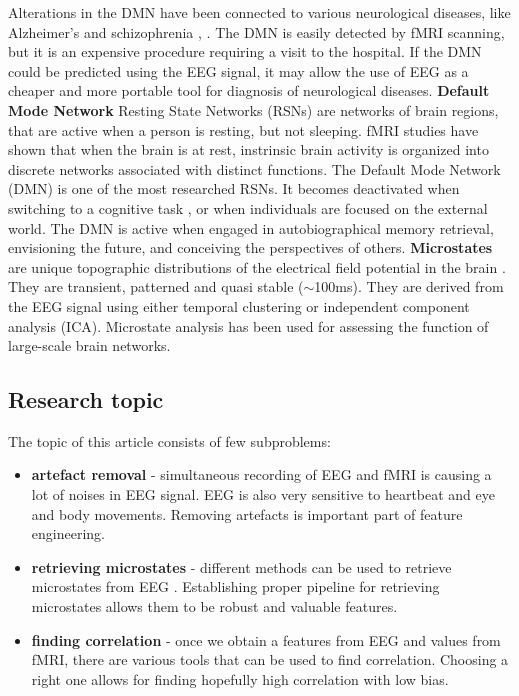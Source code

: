 \documentclass{article}
\begin{document}
Alterations in the DMN have been connected to various neurological diseases, like Alzheimer’s and schizophrenia \cite{Yuan20122062}, \cite{Khanna2015105}. The DMN is easily detected by fMRI scanning, but it is an expensive procedure requiring a visit to the hospital. If the DMN could be predicted using the EEG signal, it may allow the use of EEG as a cheaper and more portable tool for diagnosis of neurological diseases.
\textbf{Default Mode Network}
Resting State Networks (RSNs) are networks of brain regions, that are active when a person is resting, but not sleeping. fMRI studies have shown that when the brain is at rest, instrinsic brain activity is organized into discrete networks associated with distinct functions. The Default Mode Network (DMN) is one of the most researched RSNs. It becomes deactivated when switching to a cognitive task \cite{dmn_description}, or when individuals are focused on the external world. The DMN is active when engaged in autobiographical memory retrieval, envisioning the future, and conceiving the perspectives of others. 
\textbf{Microstates} are unique topographic distributions of the electrical field potential in the brain  \cite{Khanna2015105}. They are transient, patterned and quasi stable ($\sim$100ms). They are derived from the EEG signal using either temporal clustering or independent component analysis (ICA). Microstate analysis has been used for assessing the function of large-scale brain networks.


\subsection{Research topic}
The topic of this article consists of few subproblems: 
\begin{itemize}
\item \textbf{artefact removal} - simultaneous recording of EEG and fMRI is causing a lot of noises in EEG signal. EEG is also very sensitive to heartbeat and eye and body movements. Removing artefacts is important part of feature engineering. 
\item \textbf{retrieving microstates} - different methods can be used to retrieve microstates from EEG \cite{Khanna2015105}. Establishing proper pipeline for retrieving microstates allows them to be robust and valuable features. 
\item \textbf{finding correlation} - once we obtain a features from EEG and values from fMRI, there are various tools that can be used to find correlation. Choosing a right one allows for finding hopefully high correlation with low bias. 
\end{itemize}
\end{document}
